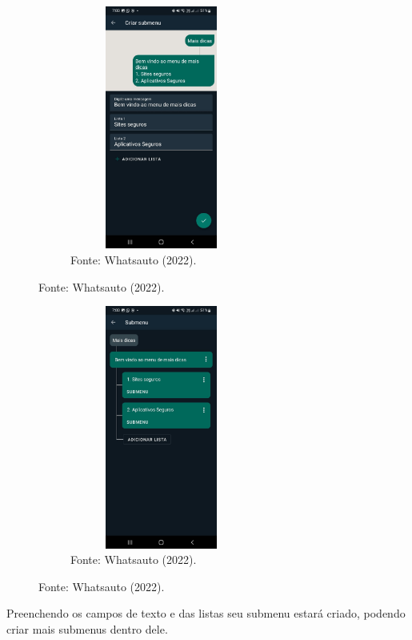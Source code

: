 \begin{itemize}
\begin{figure}[!htb]
\centering
\captionsetup[subfigure]{labelformat=empty}
\caption{``Submenu 2''}
\begin{subfigure}{.5\textwidth}
\centering
\includegraphics[width=6cm,height=8cm]{Partes/Imagens/Submenu 2.jpeg}
\caption{Fonte: Whatsauto (2022).}
\end{subfigure}%
\end{figure}

\begin{figure}[!htb]
\centering
\captionsetup[subfigure]{labelformat=empty}
\caption{``Submenu 3''}
\begin{subfigure}{.5\textwidth}
\centering
\includegraphics[width=6cm,height=8cm]{Partes/Imagens/Submenu 3.jpeg}
\caption{Fonte: Whatsauto (2022).}
\end{subfigure}%
\end{figure}

        \newpage
        
        Preenchendo os campos de texto e das listas seu submenu estará criado, podendo criar mais submenus dentro dele.
        

\end{itemize}
